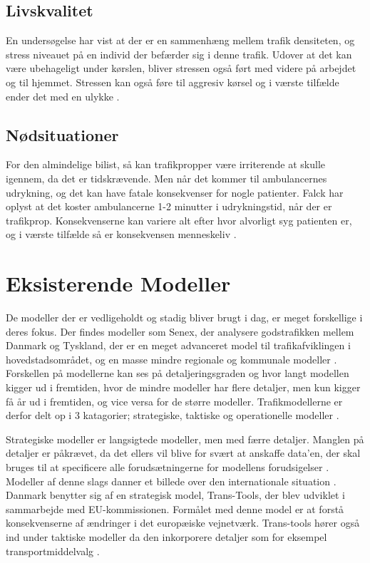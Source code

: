 \subsection{Livskvalitet}
En undersøgelse har vist at der er en sammenhæng mellem trafik densiteten, og stress niveauet på en individ der befærder sig i denne trafik. Udover at det kan være ubehageligt under kørslen, bliver stressen også ført med videre på arbejdet og til hjemmet. Stressen kan også føre til aggresiv kørsel og i værste tilfælde ender det med en ulykke \cite[s. 2-3]{stress}.

\subsection{Nødsituationer}
For den almindelige bilist, så kan trafikpropper være irriterende at skulle igennem, da det er tidskrævende. Men når det kommer til ambulancernes udrykning, og det kan have fatale konsekvenser for nogle patienter. Falck har oplyst at det koster ambulancerne 1-2 minutter i udrykningstid, når der er trafikprop. Konsekvenserne kan variere alt efter hvor alvorligt syg patienten er, og i værste tilfælde så er konsekvensen menneskeliv \cite{udrykning}. 
\section{Eksisterende Modeller}
De modeller der er vedligeholdt og stadig bliver brugt i dag, er meget forskellige i deres fokus. Der findes modeller som Senex, der analysere godstrafikken mellem Danmark og Tyskland, der er en meget advanceret model til trafikafviklingen i hovedstadsområdet, og en masse mindre regionale og kommunale modeller \cite[s. 2]{dtfnotat}. Forskellen på modellerne kan ses på detaljeringsgraden og hvor langt modellen kigger ud i fremtiden, hvor de mindre modeller har flere detaljer, men kun kigger få år ud i fremtiden, og vice versa for de større modeller. Trafikmodellerne er derfor delt op i 3 katagorier; strategiske, taktiske og operationelle modeller \cite[s. 1]{dtfnotat}.

\vspace{5mm}

Strategiske modeller er langsigtede modeller, men med færre detaljer. Manglen på detaljer er påkrævet, da det ellers vil blive for svært at anskaffe data’en, der skal bruges til at specificere alle forudsætningerne for modellens forudsigelser \cite[s. 1]{dtfnotat}. Modeller af denne slags danner et billede over den internationale situation \cite[s. 9]{dtfnotat}. Danmark benytter sig af en strategisk model, Trans-Tools, der blev udviklet i sammarbejde med EU-kommissionen. Formålet med denne model er at forstå konsekvenserne af ændringer i det europæiske vejnetværk. Trans-tools hører også ind under taktiske modeller da den inkorporere detaljer som for eksempel transportmiddelvalg \cite[s. 10]{dtfnotat}.

